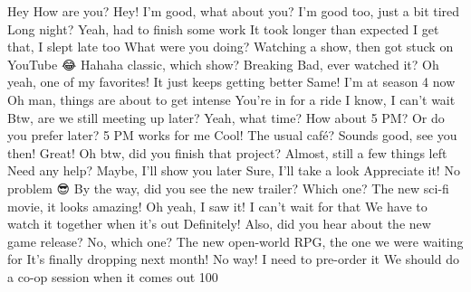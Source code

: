  Hey How are you? Hey! I’m good, what about you? I’m good too, just a bit tired Long night? Yeah, had to finish some work It took longer than expected I get that, I slept late too What were you doing? Watching a show, then got stuck on YouTube 😂 Hahaha classic, which show? Breaking Bad, ever watched it? Oh yeah, one of my favorites! It just keeps getting better Same! I’m at season 4 now Oh man, things are about to get intense You’re in for a ride I know, I can’t wait 😬 Btw, are we still meeting up later? Yeah, what time? How about 5 PM? Or do you prefer later? 5 PM works for me Cool! The usual café? Sounds good, see you then! Great! Oh btw, did you finish that project? Almost, still a few things left Need any help? Maybe, I’ll show you later Sure, I’ll take a look Appreciate it! No problem 😎 By the way, did you see the new trailer? Which one? The new sci-fi movie, it looks amazing! Oh yeah, I saw it! I can’t wait for that We have to watch it together when it’s out Definitely! Also, did you hear about the new game release? No, which one? The new open-world RPG, the one we were waiting for It’s finally dropping next month! No way! I need to pre-order it We should do a co-op session when it comes out 100%